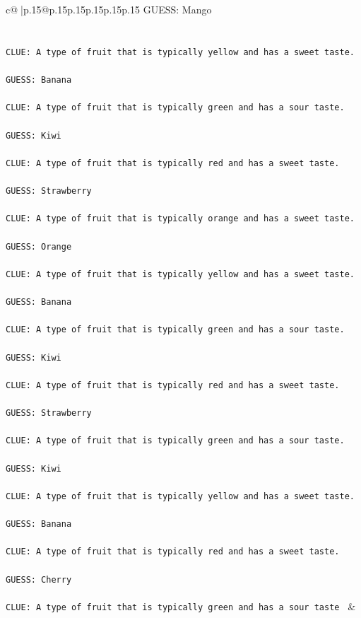 \documentclass{article}
\begin{document}
{\begin{supertabular}{c@{$\;$}|p{.15\linewidth}@{}p{.15\linewidth}p{.15\linewidth}p{.15\linewidth}p{.15\linewidth}p{.15\linewidth}}
{{{	 GUESS: Mango\\ \tt \\ \tt \\ \tt CLUE: A type of fruit that is typically yellow and has a sweet taste.\\ \tt \\ \tt GUESS: Banana\\ \tt \\ \tt CLUE: A type of fruit that is typically green and has a sour taste.\\ \tt \\ \tt GUESS: Kiwi\\ \tt \\ \tt CLUE: A type of fruit that is typically red and has a sweet taste.\\ \tt \\ \tt GUESS: Strawberry\\ \tt \\ \tt CLUE: A type of fruit that is typically orange and has a sweet taste.\\ \tt \\ \tt GUESS: Orange\\ \tt \\ \tt CLUE: A type of fruit that is typically yellow and has a sweet taste.\\ \tt \\ \tt GUESS: Banana\\ \tt \\ \tt CLUE: A type of fruit that is typically green and has a sour taste.\\ \tt \\ \tt GUESS: Kiwi\\ \tt \\ \tt CLUE: A type of fruit that is typically red and has a sweet taste.\\ \tt \\ \tt GUESS: Strawberry\\ \tt \\ \tt CLUE: A type of fruit that is typically green and has a sour taste.\\ \tt \\ \tt GUESS: Kiwi\\ \tt \\ \tt CLUE: A type of fruit that is typically yellow and has a sweet taste.\\ \tt \\ \tt GUESS: Banana\\ \tt \\ \tt CLUE: A type of fruit that is typically red and has a sweet taste.\\ \tt \\ \tt GUESS: Cherry\\ \tt \\ \tt CLUE: A type of fruit that is typically green and has a sour taste 
	  } 
	   } 
	   } 
	 & \\ 
 


\end{supertabular}}
\end{document}
